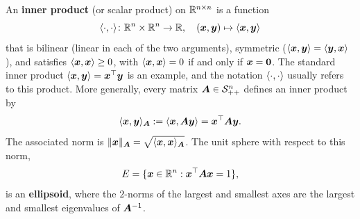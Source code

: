 An \textbf{inner product} (or scalar product) on $\mathbb{R}^{n\times n}$ is a function 
\begin{equation*}
 \langle {\cdot}, {\cdot} \rangle\colon \mathbb{R}^n\times \mathbb{R}^n \to \mathbb{R}, \quad (\bm{x},\bm{y}) \mapsto \langle {\bm{x}}, {\bm{y}} \rangle
\end{equation*}
that is bilinear (linear in each of the two arguments), symmetric ($\langle {\bm{x}}, {\bm{y}} \rangle=\langle {\bm{y}}, {\bm{x}} \rangle$), and satisfies $\langle {\bm{x}}, {\bm{x}} \rangle\geq 0$, with $\langle {\bm{x}}, {\bm{x}} \rangle=0$ if and only if $\bm{x}=\bm{0}$. The standard inner product $\langle {\bm{x}}, {\bm{y}} \rangle=\bm{x}^{\top}\bm{y}$ is an example, and the notation $\langle {\cdot}, {\cdot} \rangle$ usually refers to this product. More generally, every matrix $\bm{A}\in \mathcal{S}_{++}^n$ defines an inner product by
\begin{equation*}
 \langle {\bm{x}}, {\bm{y}} \rangle_{\bm{A}} := \langle {\bm{x}}, {\bm{A}\bm{y}} \rangle = \bm{x}^{\top}\bm{A}\bm{y}.
\end{equation*}
The associated norm is $\Vert {\bm{x}}\Vert_{\bm{A}}=\sqrt{\langle {\bm{x}}, {\bm{x}} \rangle_{\bm{A}}}$. The unit sphere with respect to this norm,
\begin{equation*}
 E = \{\bm{x}\in \mathbb{R}^n \mathrel{\mathop{:}} \bm{x}^{\top}\bm{A}\bm{x}=1\},
\end{equation*}
is an \textbf{ellipsoid}, where the $2$-norms of the largest and smallest axes are the largest and smallest eigenvalues of $\bm{A}^{-1}$. 

